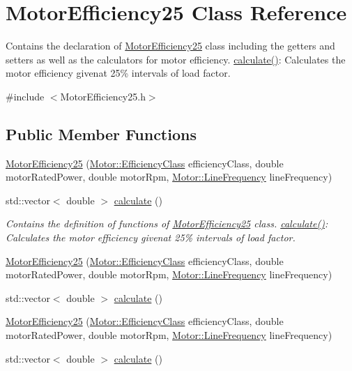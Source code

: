 \hypertarget{class_motor_efficiency25}{}\section{Motor\+Efficiency25 Class Reference}
\label{class_motor_efficiency25}


Contains the declaration of \hyperlink{class_motor_efficiency25}{Motor\+Efficiency25} class including the getters and setters as well as the calculators for motor efficiency. \hyperlink{class_motor_efficiency25_a2421a96d011677172f43d9929b250188}{calculate()}\+: Calculates the motor efficiency givenat 25\% intervals of load factor.  




{\ttfamily \#include $<$Motor\+Efficiency25.\+h$>$}

\subsection*{Public Member Functions}
\begin{DoxyCompactItemize}
\item 
\hyperlink{class_motor_efficiency25_a8e03995de84c89195fdbb250958321bc}{Motor\+Efficiency25} (\hyperlink{class_motor_afa022971ae062406a9f588c601673d4e}{Motor\+::\+Efficiency\+Class} efficiency\+Class, double motor\+Rated\+Power, double motor\+Rpm, \hyperlink{class_motor_acee1bdf1b684ad36cb80dc2829d9fcee}{Motor\+::\+Line\+Frequency} line\+Frequency)
\item 
std\+::vector$<$ double $>$ \hyperlink{class_motor_efficiency25_a2421a96d011677172f43d9929b250188}{calculate} ()
\begin{DoxyCompactList}\small\item\em Contains the definition of functions of \hyperlink{class_motor_efficiency25}{Motor\+Efficiency25} class. \hyperlink{class_motor_efficiency25_a2421a96d011677172f43d9929b250188}{calculate()}\+: Calculates the motor efficiency givenat 25\% intervals of load factor. \end{DoxyCompactList}\item 
\hyperlink{class_motor_efficiency25_a8e03995de84c89195fdbb250958321bc}{Motor\+Efficiency25} (\hyperlink{class_motor_afa022971ae062406a9f588c601673d4e}{Motor\+::\+Efficiency\+Class} efficiency\+Class, double motor\+Rated\+Power, double motor\+Rpm, \hyperlink{class_motor_acee1bdf1b684ad36cb80dc2829d9fcee}{Motor\+::\+Line\+Frequency} line\+Frequency)
\item 
std\+::vector$<$ double $>$ \hyperlink{class_motor_efficiency25_a2d7f63fa902f9930f667b779950ffb44}{calculate} ()
\item 
\hyperlink{class_motor_efficiency25_a8e03995de84c89195fdbb250958321bc}{Motor\+Efficiency25} (\hyperlink{class_motor_afa022971ae062406a9f588c601673d4e}{Motor\+::\+Efficiency\+Class} efficiency\+Class, double motor\+Rated\+Power, double motor\+Rpm, \hyperlink{class_motor_acee1bdf1b684ad36cb80dc2829d9fcee}{Motor\+::\+Line\+Frequency} line\+Frequency)
\item 
std\+::vector$<$ double $>$ \hyperlink{class_motor_efficiency25_a2d7f63fa902f9930f667b779950ffb44}{calculate} ()
\end{DoxyCompactItemize}



